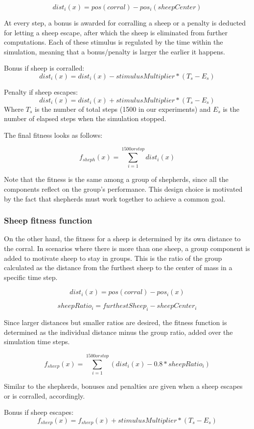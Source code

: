 \documentclass[conference]{IEEEtran}
\begin{document}
$$ dist_i(x) = pos(corral) - pos_i(sheepCenter) $$

At every step, a bonus  is awarded for corralling a sheep or a penalty is deducted for letting a sheep escape, after which the sheep is eliminated from further computations. Each of these stimulus is regulated by the time within the simulation, meaning that a bonus/penalty is larger the earlier it happens. 

Bonus if sheep is corralled:
$$ dist_i(x) = dist_i(x) - stimulusMultiplier * (T_s - E_s) $$

Penalty if sheep escapes:
$$ dist_i(x) = dist_i(x) + stimulusMultiplier * (T_s - E_s) $$
Where $T_s$ is the number of total steps (1500 in our experiments) and $E_s$ is the number of elapsed steps when the simulation stopped.

The final fitness looks as follows: 

$$ f_{sheph}(x) = \sum_{i=1}^{1500 or stop} dist_i(x) $$

Note that the fitness is the same among a group of shepherds, since all the components reflect on the group's performance. This design choice is motivated by the fact that shepherds must work together to achieve a common goal. 

\vspace{1em}
\subsubsection{Sheep fitness function}
On the other hand, the fitness for a sheep is determined by its own distance to the corral. In scenarios where there is more than one sheep, a group component is added to motivate sheep to stay in groups. This is the ratio of the group calculated as the distance from the furthest sheep to the center of mass in a specific time step. 

$$ dist_i(x) = pos(corral) - pos_i(x) $$

$$ sheepRatio_i = furthestSheep_i - sheepCenter_i $$

Since larger distances but smaller ratios are desired, the fitness function is determined as the individual distance minus the group ratio, added over the simulation time steps. 

$$ f_{sheep}(x) = \sum_{i=1}^{1500 or stop}(dist_i(x) - 0.8 * sheepRatio_i) $$

Similar to the shepherds, bonuses and penalties are given when a sheep escapes or is corralled, accordingly.  

Bonus if sheep escapes:
$$ f_{sheep}(x) = f_{sheep}(x) + stimulusMultiplier * (T_s - E_s) $$
\end{document}

